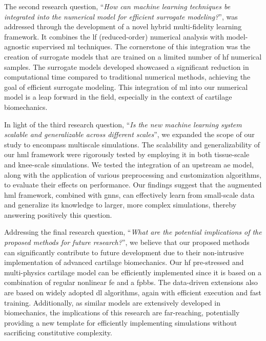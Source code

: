 The second research question, ``\textit{How can machine learning techniques be integrated into the numerical model for efficient surrogate modeling?}'', was addressed through the development of a novel hybrid multi-fidelity learning framework. It combines the \ac{lf} (reduced-order) numerical analysis with model-agnostic supervised \ac{ml} techniques. The cornerstone of this integration was the creation of surrogate models that are trained on a limited number of \ac{hf} numerical samples. The surrogate models developed showcased a significant reduction in computational time compared to traditional numerical methods, achieving the goal of efficient surrogate modeling. This integration of \ac{ml} into our numerical model is a leap forward in the field, especially in the context of cartilage biomechanics.

In light of the third research question, ``\textit{Is the new machine learning system scalable and generalizable across different scales}'', we expanded the scope of our study to encompass multiscale simulations. The scalability and generalizability of our \ac{hml} framework were rigorously tested by employing it in both tissue-scale and knee-scale simulations. We tested the integration of an upstream \ac{ae} model, along with the application of various preprocessing and customization algorithms, to evaluate their effects on performance. Our findings suggest that the augmented \ac{hml} framework, combined with \acp{gnn}, can effectively learn from small-scale data and generalize its knowledge to larger, more complex simulations, thereby answering positively this question.

Addressing the final research question, ``\textit{What are the potential implications of the proposed methods for future research?}'', we believe that our proposed methods can significantly contribute to future development due to their non-intrusive implementation of advanced cartilage biomechanics. Our \ac{hf} pre-stressed and multi-physics cartilage model can be efficiently implemented since it is based on a combination of regular nonlinear \ac{fe} and a \ac{fpbbs}. The data-driven extensions also are based on widely adopted \ac{dl} algorithms, again with efficient execution and fast training. Additionally, as similar models are extensively developed in biomechanics, the implications of this research are far-reaching, potentially providing a new template for efficiently implementing simulations without sacrificing constitutive complexity.

